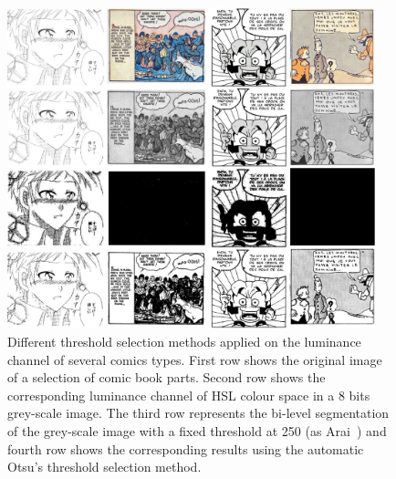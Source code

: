 	\begin{figure}[h!]	%
	  \centering
		\includegraphics[trim= 0px 0px 0px 0px, clip, width=0.95\textwidth]{threshold_selection.jpg}
		\caption[Different threshold selection applied on a grey-scale image]{Different threshold selection methods applied on the luminance channel of several comics types. First row shows the original image of a selection of comic book parts. Second row shows the corresponding luminance channel of HSL colour space in a 8 bits grey-scale image. The third row represents the bi-level segmentation of the grey-scale image with a fixed threshold at 250 (as Arai~\cite{Arai11}) and fourth row shows the corresponding results using the automatic Otsu's threshold selection method.}
		\label{fig:in:threshold_selection_methods}
	\end{figure}





